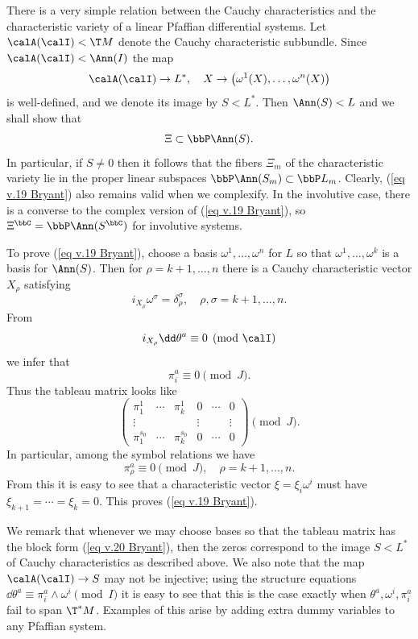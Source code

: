 \begin{rem}
    There is a very simple relation between the Cauchy characteristics and the characteristic variety of a linear Pfaffian differential systems. Let $\calA(\calI)<\T M$ denote the Cauchy characteristic subbundle. Since $\calA(\calI)<\Ann(I)$ the map 
    \[\calA(\calI)\to L^\ast,\quad X\to \left(\omega^1(X),\ldots,\omega^n(X)\right)\]
    is well-defined, and we denote its image by $S<L^\ast$. Then $\Ann(S)<L$ and we shall show that 
    \[\Xi \subset\bbP \Ann(S).\label{eq v.19 Bryant}\]
    In particular, if $S\neq 0$ then it follows that the fibers $\Xi_m$ of the characteristic variety lie in the proper linear subspaces $\bbP \Ann(S_m)\subset \bbP L_m$. Clearly, (\ref{eq v.19 Bryant}) also remains valid when we complexify. In the involutive case, there is a converse to the complex version of (\ref{eq v.19 Bryant}), so $\Xi^\bbC=\bbP\Ann(S^\bbC)$ for involutive systems.

    To prove (\ref{eq v.19 Bryant}), choose a basis $\omega^1,\ldots,\omega^n$ for $L$ so that $\omega^1,\ldots,\omega^k$ is a basis for $\Ann(S)$. Then for $\rho=k+1,\ldots,n$ there is a Cauchy characteristic vector $X_\rho$ satisfying 
    \[i_{X_\rho}\omega^\sigma=\delta^\sigma_\rho,\quad \rho,\sigma=k+1,\ldots,n.\]
    From 
    \[i_{X_\rho}\dd\theta^a\equiv 0\pmod{\calI}\]
    we infer that 
    \[\pi^a_i\equiv 0\pmod{J}.\]
    Thus the tableau matrix looks like 
    \[\begin{pmatrix}
        \pi^1_1 & \cdots & \pi^1_k & 0 & \cdots & 0\\
        \vdots & & & \vdots & & \vdots \\
        \pi^{s_0}_1 & \cdots & \pi^{s_0}_k & 0 & \cdots & 0
    \end{pmatrix}\pmod{J}.\label{eq v.20 Bryant}\]
    In particular, among the symbol relations we have 
    \[\pi^a_\rho \equiv 0\pmod{J},\quad \rho=k+1,\ldots,n.\]
    From this it is easy to see that a characteristic vector $\xi=\xi_i\omega^i$ must have $\xi_{k+1}=\cdots=\xi_k=0$. This proves (\ref{eq v.19 Bryant}).

    We remark that whenever we may choose bases so that the tableau matrix has the block form (\ref{eq v.20 Bryant}), then the zeros correspond to the image $S< L^\ast$ of Cauchy characteristics as described above. We also note that the map $\calA(\calI)\to S$ may not be injective; using the structure equations $\dd\theta^a\equiv \pi^a_i\wedge\omega^i\pmod{I}$ it is easy to see that this is the case exactly when $\theta^a,\omega^i,\pi^a_i$ fail to span $\T^\ast M$. Examples of this arise by adding extra dummy variables to any Pfaffian system.
\end{rem}


